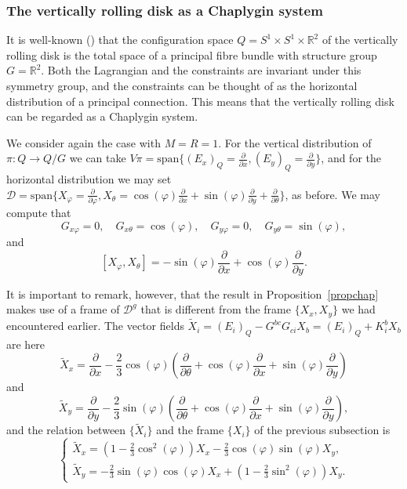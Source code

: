 \documentclass[11pt]{article}
\def\D{{\mathcal D}}
\begin{document}
 







\subsubsection{The vertically rolling disk as a Chaplygin system}

It is well-known (\cite{Bloch,Cortes}) that the configuration space $Q=S^1\times S^1\times \mathbb{R}^2$ of the vertically rolling disk is the total space of a principal fibre bundle with structure group $G=\mathbb{R}^2$. Both the Lagrangian and the constraints are invariant under this symmetry group, and the constraints can be thought of as the horizontal distribution of a principal connection. This means that the vertically rolling disk can be regarded as a Chaplygin system.

We consider again the case with $M=R=1$.  For the vertical distribution of $\pi:Q\rightarrow Q/G$ we can take $V\pi=\text{span} \{({E}_x)_Q=\frac{\partial}{\partial x} ,({E}_y)_Q=\frac{\partial }{\partial y}\}$, and for the horizontal distribution we may set $\mathcal{D}=\text{span}\{X_\varphi=\frac{\partial}{\partial \varphi},X_\theta=\cos(\varphi)\frac{\partial}{\partial x}+ \sin(\varphi)\frac{\partial}{\partial y} +\frac{\partial}{\partial \theta} \}$, as before. We may compute that  
\[
G_{x \varphi}=0, \quad
G_{x \theta}=\cos( \varphi), \quad G_{y \varphi}=0, \quad G_{y \theta}=\sin( \varphi),
\]
and
\[ \left[X_{\varphi}, X_\theta\right]=-\sin (\varphi) \frac{\partial}{\partial x}+\cos (\varphi) \frac{\partial}{\partial y}.
\]


It is important to remark, however, that the result in Proposition~\ref{propchap} makes use of a frame of $\D^g$ that is different from the frame $\{X_x,X_y\}$ we had encountered earlier. The vector fields 
${\tilde X}_i =({E}_i)_Q-G^{bc}G_{ci} X_b=({E}_i)_Q+K^b_i X_b$ are here 
$$
{\tilde X}_x=\frac{\partial}{\partial x}- \frac{2}{3} \cos(\varphi)\left(\frac{\partial}{\partial \theta}+\cos(\varphi)\frac{\partial}{\partial x}+\sin(\varphi)\frac{\partial}{\partial y}\right)
$$
 and
$$
{\tilde X}_y=\frac{\partial}{\partial y}- \frac{2}{3} \sin(\varphi)\left(\frac{\partial}{\partial \theta}+\cos(\varphi)\frac{\partial}{\partial x}+\sin(\varphi)\frac{\partial}{\partial y}\right),
$$
and the  relation between $\{{\tilde X}_i\}$ and the frame $\{{X}_i\}$ of the previous subsection is 
\begin{equation*}
\begin{cases}
    {\tilde X}_x=(1- \frac{2}{3} \cos^2(\varphi))X_x- \frac{2}{3} \cos(\varphi)\sin(\varphi) X_y,\\
    {\tilde X}_y=- \frac{2}{3} \sin(\varphi)\cos(\varphi) X_x+(1- \frac{2}{3} \sin^2(\varphi))X_y.
\end{cases}\nonumber
\end{equation*}
\end{document}
